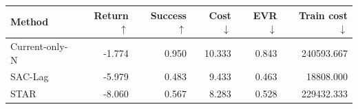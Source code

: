\begin{tabular}{lrrrrr}
\toprule
        Method &  Return $\uparrow$ &  Success $\uparrow$ &  Cost $\downarrow$ &  EVR $\downarrow$ &  Train cost $\downarrow$ \\
\midrule
Current-only-N &             -1.774 &               0.950 &             10.333 &             0.843 &               240593.667 \\
       SAC-Lag &             -5.979 &               0.483 &              9.433 &             0.463 &                18808.000 \\
          STAR &             -8.060 &               0.567 &              8.283 &             0.528 &               229432.333 \\
\bottomrule
\end{tabular}
